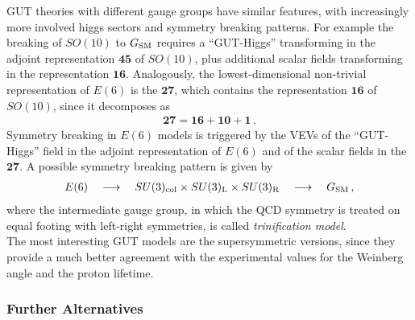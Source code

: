 \documentclass[12pt,a4paper]{book}
\begin{document}
GUT theories with different gauge groups have similar features, with increasingly more involved higgs sectors and symmetry breaking patterns. For example the breaking of $SO(10)$ to $G_{\rm SM}$ requires a ``GUT-Higgs'' transforming in the adjoint representation $\mathbf{45}$ of $SO(10)$, plus additional scalar fields transforming in the representation $\mathbf{16}$. Analogously, the lowest-dimensional non-trivial representation of $E(6)$ is the $\mathbf{27}$, which contains the representation $\mathbf{16}$ of $SO(10)$, since it decomposes as
\begin{align}
\label{eq:27GroupDecomposition}
\mathbf{27} = \mathbf{16} + \mathbf{10} + \mathbf{1} \,.
\end{align}
Symmetry breaking in $E(6)$ models is triggered by the VEVs of the ``GUT-Higgs'' field in the adjoint representation of $E(6)$ and of the scalar fields in the $\mathbf{27}$. A possible symmetry breaking pattern is given by
\begin{align}
\label{eq:E6Symmetrybreaking}
E(6) \quad \longrightarrow \quad SU(3)_{\rm col} \times SU(3)_{\rm L} \times SU(3)_{\rm R} \quad \longrightarrow \quad G_{\rm SM}\,,
\end{align}
where the intermediate gauge group, in which the QCD symmetry is treated on equal footing with left-right symmetries, is called \textit{trinification model}.\\

The most interesting GUT models are the supersymmetric versions, since they provide a much better agreement with the experimental values for the Weinberg angle and the proton lifetime.

\subsubsection{Further Alternatives}
\label{sssec:Alternatives}
\end{document}
